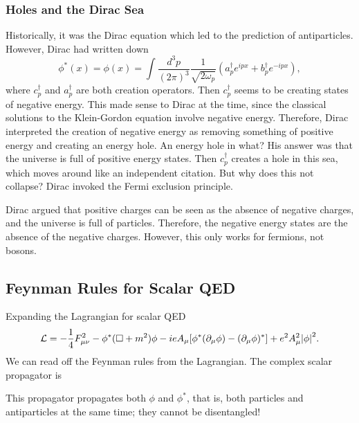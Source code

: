 \documentclass[11pt]{article}
\theoremstyle{definition}
\begin{document}
\subsubsection{Holes and the Dirac Sea}
Historically, it was the Dirac equation which led to the prediction of antiparticles. However, Dirac had written down
\begin{equation}
    \phi^*(x) = \phi(x) =  \int \frac{d^3p}{(2\pi)^3}\frac{1}{\sqrt{2\omega_p}}(a_p^\dagger e^{ipx} + b_p^\dagger e^{-ipx}),
\end{equation}
where $c_p^\dagger$ and $a_p^\dagger$ are both creation operators. Then $c_p^\dagger$ seems to be creating states of negative energy. This made sense to Dirac at the time, since the classical solutions to the Klein-Gordon equation involve negative energy. Therefore, Dirac interpreted the creation of negative energy as removing something of positive energy and creating an energy hole. An energy hole in what? His answer was that the universe is full of positive energy states. Then $c_p^\dagger$ creates a hole in this sea, which moves around like an independent citation. But why does this not collapse? Dirac invoked the Fermi exclusion principle. 

Dirac argued that positive charges can be seen as the absence of negative charges, and the universe is full of particles. Therefore, the negative energy states are the absence of the negative charges. However, this only works for fermions, not bosons.

\subsection{Feynman Rules for Scalar QED}
Expanding the Lagrangian for scalar QED
\begin{equation}
    \mathcal{L} = -\frac{1}{4}F_{\mu\nu}^2 -\phi^*(\square+m^2)\phi - ieA_\mu[\phi^*(\partial_\mu\phi) - (\partial_\mu\phi)^*] + e^2A_\mu^2\abs{\phi}^2.
\end{equation}
We can read off the Feynman rules from the Lagrangian. The complex scalar propagator is
\begin{center}
\end{center}
This propagator propagates both $\phi$ and $\phi^*$, that is, both particles and antiparticles at the same time; they cannot be disentangled!
\end{document}
